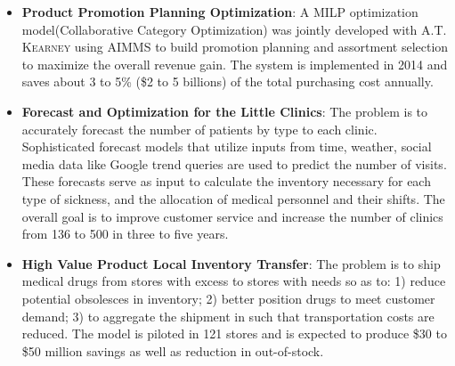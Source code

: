 \documentclass[12pt,a4paper,roman]{moderncv} %
\begin{document}
{} 
{

\begin{itemize}
\item \textbf{Product Promotion Planning Optimization}: A MILP optimization model(Collaborative Category Optimization) was
jointly developed with \textsc{A.T. Kearney} using AIMMS to build promotion planning and
assortment selection to maximize the overall revenue gain.
The system is implemented in 2014 and saves about 3 to 5\% (\$2 to 5 billions) of the total purchasing cost annually.
\item \textbf{Forecast and Optimization for the Little Clinics}: The problem is
to accurately forecast the number of patients by type to each clinic.
Sophisticated forecast models that utilize inputs from time, weather, social
media data like Google trend queries are used to predict the number of
visits. These forecasts serve as input to calculate the inventory necessary for
each type of sickness, and the allocation of medical personnel and their
shifts. The overall goal is to improve customer service and increase the number
of clinics from 136 to 500 in three to five years.
\item \textbf{High Value Product Local Inventory Transfer}:  The problem is to ship 
medical drugs from stores with excess to stores with needs so as to: 1) reduce
potential obsolesces in inventory; 2) better position drugs to meet customer
demand; 3) to aggregate the shipment in such that transportation costs are
reduced. The model is piloted in 121 stores and is expected
to produce \$30 to \$50 million savings as well as reduction in
out-of-stock.
\end{itemize} }
 
\end{document}
